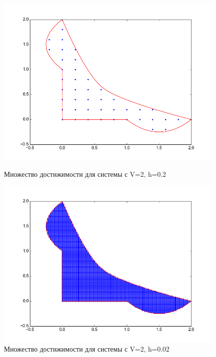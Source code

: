 \begin{figure}[h]
\begin{minipage}[h]{0.47\linewidth}
  \noindent \hfil
  \includegraphics[width=1\linewidth]{img/figure_v_2_h_02.png}
  \hfil \caption{Множество достижимости для системы с V=2, h=0.2}
  \label{fig:v21}
\end{minipage}
\hfill
\begin{minipage}[h]{0.47\linewidth}
  \noindent \hfil
  \includegraphics[width=1\linewidth]{img/figure_v_2_h_002.png}
  \hfil \caption{Множество достижимости для системы с V=2, h=0.02}
  \label{fig:v22}
\end{minipage}
\vfill
\begin{minipage}[h]{0.47\linewidth}

\end{minipage}
\end{figure}
